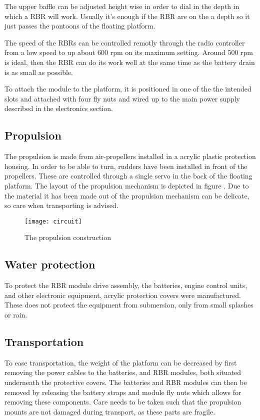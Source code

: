 The upper baffle can be adjusted height wise in order to dial in the
depth in which a RBR will work. Usually it's enough if the RBR are on the a
depth so it just passes the pontoons of the floating platform.

The speed of the RBRs can be controlled remotly through the radio controller
from a low speed to up about 600 rpm on its maximum setting. Around 500 rpm is
ideal, then the RBR can do its work well at the same time as the battery drain
is as small as possible.

To attach the module to the platform, it is positioned in one of the the
intended slots and attached with four fly nuts and wired up to the main power
supply described in the electronics section.

\subsection{Propulsion}
The propulsion is made from air-propellers installed in a acrylic plastic protection housing. In order to be able to turn, rudders have been installed in front of the propellers. These are controlled through a single servo in the back of the floating platform. The layout of the propulsion mechanism is depicted in figure . Due to the material it has been made out of the propulsion mechanism can be delicate, so care when transporting is advised. 
\begin{figure}[h]
   \centering
   \texttt{[image: circuit]}
   \caption{The propulsion construction}
   \label{fig:circuit}
\end{figure}

\subsection{Water protection}
To protect the RBR module drive assembly, the batteries, engine control units, and other electronic equipment, acrylic protection covers were manufactured. These does not protect the equipment from submersion, only from small splashes or rain. 
\subsection{Transportation}
To ease transportation, the weight of the platform can be decreased by first removing the power cables to the batteries, and RBR modules, both situated underneath the protective covers. The batteries and RBR modules can then be removed by releasing the battery straps and module fly nuts which allows for removing these components. Care needs to be taken such that the propulsion mounts are not damaged during transport, as these parts are fragile.


